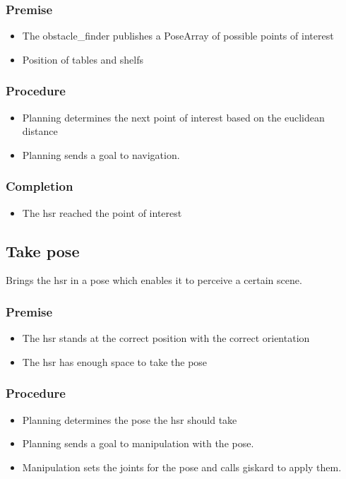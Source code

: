 \documentclass[main.tex]{subfiles}
\begin{document}
	\subsubsection{Premise}
		\begin{itemize}
			\item The obstacle\_finder publishes a PoseArray of possible points of interest
			\item Position of tables and shelfs 
		\end{itemize} 
		
	\subsubsection{Procedure}
		\begin{itemize}			
			\item Planning determines the next point of interest based on the euclidean distance
			\item Planning sends a goal to navigation. 				
		\end{itemize}
	
	\subsubsection{Completion}
		\begin{itemize}
			\item The hsr reached the point of interest		
		\end{itemize}
		
	\subsection{Take pose}
	Brings the hsr in a pose which enables it to perceive a certain scene.
	
	\subsubsection{Premise}
	\begin{itemize}
		\item The hsr stands at the correct position with the correct orientation
		\item The hsr has enough space to take the pose  
	\end{itemize} 
	
	\subsubsection{Procedure}
	\begin{itemize}			
		\item Planning determines the pose the hsr should take
		\item Planning sends a goal to manipulation with the pose.
		\item Manipulation sets the joints for the pose and calls giskard to apply them. 				
	\end{itemize}
	
\end{document}
